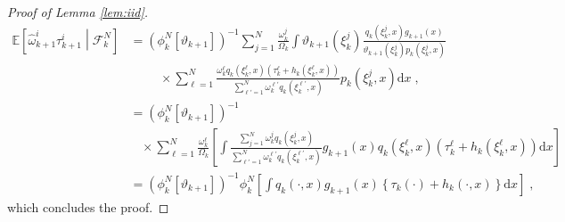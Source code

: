\documentclass[12pt,draft]{article}
\newcommand{\rmd}{\mathrm{d}}
\newcommand{\eqsp}{\;}
\newcommand{\1}{\mathrm{1}}
\newcommand{\qk}{q_{k}}
\begin{document}
\begin{proof}[Proof of Lemma \ref{lem:iid}]
\begin{align*}
\mathbb{E}\left[\widehat{\omega}^i_{k+1}\tau^{i}_{k+1}\middle| \mathcal{F}_k^{N}\right]&= \left(\phi^N_{k}[\vartheta_{k+1}]\right)^{-1} \sum_{j=1}^N\frac{\omega_k^j}{\Omega_k} \int \vartheta_{k+1}(\xi^{j}_{k})\frac{\qk(\xi_{k}^{j},x) g_{k+1}(x)}{\vartheta_{k+1}(\xi^{j}_{k}) p_{k}(\xi_{k}^{j},x)}\\
&\hspace{1cm}\times \sum_{\ell=1}^N\frac{\omega_k^{\ell} \qk (\xi_{k}^{\ell},x)\left(\tau^{\ell}_k + h_{k}(\xi_{k}^{\ell},x)\right)}{\sum_{\ell'=1}^N\omega_k^{\ell'}\qk(\xi_{k}^{\ell'},x)}p_{k}(\xi_{k}^{j},x)\rmd x\eqsp,\\
&= \left(\phi^N_{k}[\vartheta_{k+1}]\right)^{-1}\\
&~~~~\times\sum_{\ell=1}^N \frac{\omega_k^\ell}{\Omega_k}\left[\int \frac{ \sum_{j=1}^N \omega_k^j\qk(\xi_k^j,x) }{ \sum_{\ell'=1}^N\omega_k^{\ell'}\qk(\xi_{k}^{\ell'},x) } g_{k+1}(x)\qk (\xi_{k}^{\ell},x)\left(\tau^{\ell}_k + h_{k}(\xi_{k}^{\ell},x)\right) \rmd x \right]\\ 
& =\left(\phi^N_{k}[\vartheta_{k+1}]\right)^{-1}\phi^N_{k}\left[\int \qk(\cdot,x)g_{k+1}(x)\left\{\tau_k(\cdot) + h_{k}(\cdot,x)\right\}\rmd x\right]\eqsp,
\end{align*}
which concludes the proof.
\end{proof}
\end{document}
